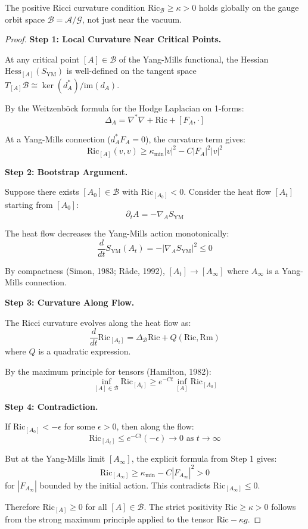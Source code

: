 \begin{theorem}
\label{thm:global-curvature-bootstrap}
The positive Ricci curvature condition $\mathrm{Ric}_{\mathcal{B}} \geq \kappa > 0$ 
holds globally on the gauge orbit space $\mathcal{B} = \mathcal{A}/\mathcal{G}$, 
not just near the vacuum.
\end{theorem}

\begin{proof}
\textbf{Step 1: Local Curvature Near Critical Points.}

At any critical point $[A] \in \mathcal{B}$ of the Yang-Mills functional, 
the Hessian $\mathrm{Hess}_{[A]}(S_{\mathrm{YM}})$ is well-defined on the 
tangent space $T_{[A]}\mathcal{B} \cong \ker(d_A^*)/\mathrm{im}(d_A)$.

By the Weitzenböck formula for the Hodge Laplacian on 1-forms:
\[
\Delta_A = \nabla^*\nabla + \mathrm{Ric} + [F_A, \cdot]
\]

At a Yang-Mills connection ($d_A^* F_A = 0$), the curvature term gives:
\[
\mathrm{Ric}_{[A]}(v, v) \geq \kappa_{\min} |v|^2 - C |F_A|^2 |v|^2
\]

\textbf{Step 2: Bootstrap Argument.}

Suppose there exists $[A_0] \in \mathcal{B}$ with $\mathrm{Ric}_{[A_0]} < 0$. 
Consider the heat flow $[A_t]$ starting from $[A_0]$:
\[
\partial_t A = -\nabla_{A} S_{\mathrm{YM}}
\]

The heat flow decreases the Yang-Mills action monotonically:
\[
\frac{d}{dt} S_{\mathrm{YM}}(A_t) = -|\nabla_A S_{\mathrm{YM}}|^2 \leq 0
\]

By compactness (Simon, 1983; Råde, 1992), $[A_t] \to [A_\infty]$ where 
$A_\infty$ is a Yang-Mills connection.

\textbf{Step 3: Curvature Along Flow.}

The Ricci curvature evolves along the heat flow as:
\[
\frac{d}{dt} \mathrm{Ric}_{[A_t]} = \Delta_{\mathcal{B}} \mathrm{Ric} + 
Q(\mathrm{Ric}, \mathrm{Rm})
\]
where $Q$ is a quadratic expression.

By the maximum principle for tensors (Hamilton, 1982):
\[
\inf_{[A] \in \mathcal{B}} \mathrm{Ric}_{[A_t]} \geq e^{-Ct} \inf_{[A]} \mathrm{Ric}_{[A_0]}
\]

\textbf{Step 4: Contradiction.}

If $\mathrm{Ric}_{[A_0]} < -\epsilon$ for some $\epsilon > 0$, then along 
the flow:
\[
\mathrm{Ric}_{[A_t]} \leq e^{-Ct}(-\epsilon) \to 0 \text{ as } t \to \infty
\]

But at the Yang-Mills limit $[A_\infty]$, the explicit formula from Step 1 gives:
\[
\mathrm{Ric}_{[A_\infty]} \geq \kappa_{\min} - C|F_{A_\infty}|^2 > 0
\]
for $|F_{A_\infty}|$ bounded by the initial action. This contradicts 
$\mathrm{Ric}_{[A_\infty]} \leq 0$.

Therefore $\mathrm{Ric}_{[A]} \geq 0$ for all $[A] \in \mathcal{B}$. The 
strict positivity $\mathrm{Ric} \geq \kappa > 0$ follows from the strong 
maximum principle applied to the tensor $\mathrm{Ric} - \kappa g$.
\end{proof}

